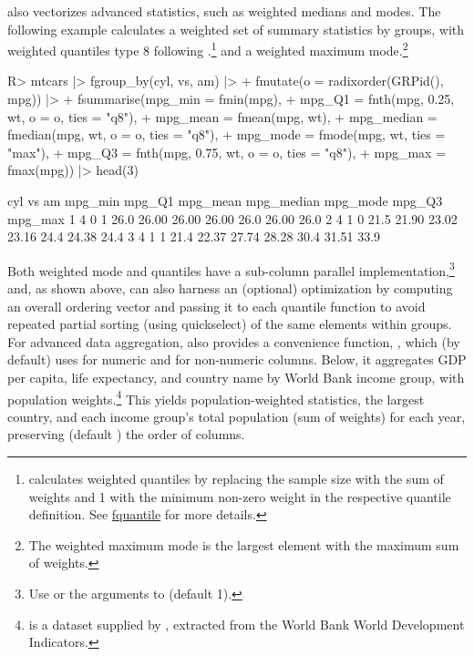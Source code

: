 \documentclass[nojss]{jss} %
\newcommand{\fct}[1]{\code{#1()}}
\begin{document}
 also vectorizes advanced statistics, such as weighted medians and modes. The following example calculates a weighted set of summary statistics by groups, with weighted quantiles type 8 following \citet{hyndman1996sample}.\footnote{ calculates weighted quantiles by replacing the sample size with the sum of weights and 1 with the minimum non-zero weight in the respective quantile definition. See \href{https://sebkrantz.github.io/collapse/reference/fquantile.html}{fquantile} for more details.} and a weighted maximum mode.\footnote{The weighted maximum mode is the largest element with the maximum sum of weights.}
%
\begin{Schunk}
\begin{Sinput}
R> mtcars |> fgroup_by(cyl, vs, am) |>
+    fmutate(o = radixorder(GRPid(), mpg)) |>
+    fsummarise(mpg_min = fmin(mpg),
+               mpg_Q1 = fnth(mpg, 0.25, wt, o = o, ties = "q8"),
+               mpg_mean = fmean(mpg, wt),
+               mpg_median = fmedian(mpg, wt, o = o, ties = "q8"),
+               mpg_mode = fmode(mpg, wt, ties = "max"),
+               mpg_Q3 = fnth(mpg, 0.75, wt, o = o, ties = "q8"),
+               mpg_max = fmax(mpg)) |> head(3)
\end{Sinput}
\begin{Soutput}
  cyl vs am mpg_min mpg_Q1 mpg_mean mpg_median mpg_mode mpg_Q3 mpg_max
1   4  0  1    26.0  26.00    26.00      26.00     26.0  26.00    26.0
2   4  1  0    21.5  21.90    23.02      23.16     24.4  24.38    24.4
3   4  1  1    21.4  22.37    27.74      28.28     30.4  31.51    33.9
\end{Soutput}
\end{Schunk}
%
Both weighted mode and quantiles have a sub-column parallel implementation,\footnote{Use  or the  arguments to  (default 1).} and, as shown above, can also harness an (optional) optimization by computing an overall ordering vector and passing it to each quantile function to avoid repeated partial sorting (using quickselect) of the same elements within groups. For advanced data aggregation,  also provides a convenience function, \fct{collap}, which (by default) uses  for numeric and  for non-numeric columns. Below, it aggregates GDP per capita, life expectancy, and country name by World Bank income group, with population weights.\footnote{\href{https://sebkrantz.github.io/collapse/reference/wlddev.html}{} is a dataset supplied by , extracted from the World Bank World Development Indicators.} This yields population-weighted statistics, the largest country, and each income group's total population (sum of weights) for each year, preserving (default ) the order of columns.
\end{document}
